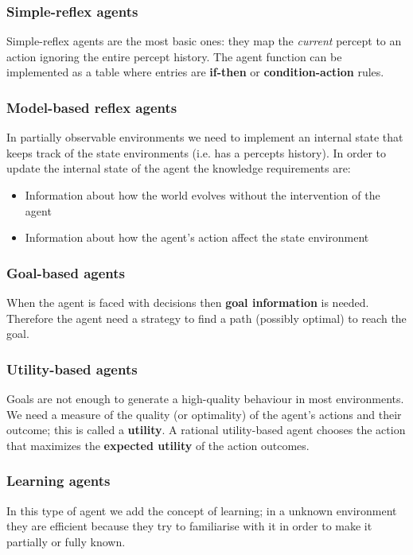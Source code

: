 \documentclass[a4paper, 11pt]{article}
\begin{document}
\subsubsection*{Simple-reflex agents}
Simple-reflex agents are the most basic ones: they map the \emph{current} percept to an action ignoring the entire percept history.
The agent function can be implemented as a table where entries are \textbf{if-then} or \textbf{condition-action} rules.

\subsubsection*{Model-based reflex agents}
In partially observable environments we need to implement an internal state that keeps track of the state environments (i.e. has a percepts history).
In order to update the internal state of the agent the knowledge requirements are:
\begin{itemize}
  \item Information about how the world evolves without the intervention of the agent
  \item Information about how the agent's action affect the state environment
\end{itemize}

\subsubsection*{Goal-based agents}
When the agent is faced with decisions then \textbf{goal information} is needed. Therefore the agent need a strategy to find a path (possibly optimal) to reach the goal.

\subsubsection*{Utility-based agents}
Goals are not enough to generate a high-quality behaviour in most environments. We need a measure of the quality (or optimality) of the agent's actions and their outcome; this is called a \textbf{utility}. A rational utility-based agent chooses the action that maximizes the \textbf{expected utility} of the action outcomes.

\subsubsection*{Learning agents}
In this type of agent we add the concept of learning; in a unknown environment they are efficient because they try to familiarise with it in order to make it partially or fully known.
\end{document}
